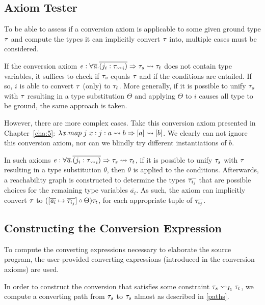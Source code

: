 \subsection{Axiom Tester}
\label{onestep}
To be able to assess if a conversion axiom is applicable to some given ground type $\type$ and compute the types it can implicitly convert $\type$ into, multiple cases must be considered.

 If the conversion axiom $\term : \forall \overline {\tyVar} . \overline{(j_i : \convmono_i)} \Rightarrow \type_s \rightsquigarrow \type_t$ does not contain type variables, it suffices to check if $\type_s$ equals $\type$ and if the conditions are entailed. If so, $i$ is able to convert $\type$ (only) to $\type_t$. More generally, if it is possible to unify $\type_s$ with $\type$ resulting in a type substitution $\Theta$ and applying $\Theta$ to $i$ causes all type to be ground, the same approach is taken.

 However, there are more complex cases. Take this conversion axiom presented in Chapter~\ref{cha:5}: $\lambda \tmVar . map\;j\;\tmVar: j: a \rightsquigarrow b \Rightarrow [a] \rightsquigarrow [b] $. We clearly can not ignore this conversion axiom, nor can we blindly try different instantiations of $b$. 

 In such axioms $\term : \forall \overline {\tyVar} . \overline{(j_i : \convmono_i)} \Rightarrow \type_s \rightsquigarrow \type_t$, if it is possible to unify $\type_s$ with $\type$ resulting in a type substitution $\theta$, then $\theta$ is applied to the conditions. Afterwards, a reachability graph is constructed to determine the types $\overline{\type_{i_j}}$ that are possible choices for the remaining type variables $\overline{a_i}$. As such, the axiom can implicitly convert $\type$ to  $([\overline{\tyVar_i} \mapsto \overline{\type_{i_j}}]\circ \Theta)\type_t$, for each appropriate tuple of $\overline{\type_{i_j}}$.



\subsection{Constructing the Conversion Expression}
\label{constr}
To compute the converting expressions necessary to elaborate the source program, the user-provided converting expressions (introduced in the conversion axioms) are used.

In order to construct the conversion that satisfies some constraint $\convX{\imEnv_1}{\type_s}{\type_t}$, we compute a converting path from $\type_s$ to $\type_s$ almost as described in \ref{paths}.

